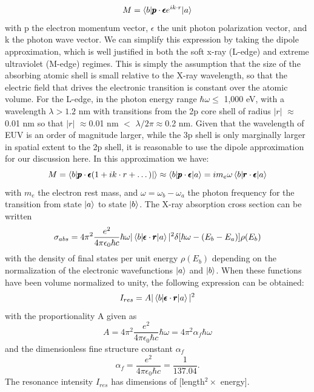 \begin{equation}
M = \braket{b| \pmb{p}\cdot \pmb{\epsilon} e^{ik\cdot r}|a}
\end{equation}
with p the electron momentum vector, $\epsilon$ the unit photon polarization vector, and k the photon wave vector. We can simplify this expression by taking the dipole approximation, which is well justified in both the soft x-ray (L-edge) and extreme ultraviolet (M-edge) regimes. This is simply the assumption that the size of the absorbing atomic shell is small relative to the X-ray wavelength, so that the electric field that drives the electronic transition is constant over the atomic volume. For the L-edge, in the photon energy range $\hbar\omega\leq$ 1,000 eV, with a wavelength $\lambda>1.2$ nm with transitions from the 2p core shell of radius $|r|$ $\approx$0.01 nm so that $|r|$ $\approx$0.01 nm $<$ $\lambda/2\pi\approx$0.2 nm. Given that the wavelength of EUV is an order of magnitude larger, while the 3p shell is only marginally larger in spatial extent to the 2p shell, it is reasonable to use the dipole approximation for our discussion here. In this approximation we have:
\begin{equation}
M = \braket{b|\pmb{p}\cdot\pmb{\epsilon}(1+ik\cdot r + \dots)|} \approx \braket{b|\pmb{p}\cdot \pmb{\epsilon} |a} = i m_e \omega \braket{b|\pmb{r} \cdot \pmb{\epsilon} |a}
\end{equation}
with $m_e$ the electron rest mass, and $\omega=\omega_b-\omega_a$ the photon frequency for the transition from state $\ket{a}$ to state $\ket{b}$. The X-ray absorption cross section can be written
\begin{equation}
\sigma_{abs} = 4\pi^2\frac{e^2}{4\pi\epsilon_0\hbar c}\hbar \omega |\braket{b|\pmb{\epsilon}\cdot \pmb{r}|a}|^2\delta[\hbar\omega-(E_b-E_a)]\rho(E_b)
\end{equation}
with the density of final states per unit energy $\rho(E_b)$ depending on the normalization of the electronic wavefunctions $\ket{a}$ and $\ket{b}$. When these functions have been volume normalized to unity, the following expression can be obtained:
\begin{equation}
I_{res} = A|\braket{b|\pmb{\epsilon} \cdot \pmb{r}|a}|^2
\end{equation}
with the proportionality A given as
\begin{equation}
A=4\pi^2\frac{e^2}{4\pi\epsilon_0\hbar c}\hbar\omega = 4\pi^2 \alpha_f \hbar \omega
\end{equation}
and the dimensionless fine structure constant $\alpha_f$
\begin{equation}
\alpha_f=\frac{e^2}{4\pi\epsilon_0\hbar c} = \frac{1}{137.04}.
\end{equation}
The resonance intensity $I_{res}$ has dimensions of [length$^2 \times$ energy].

